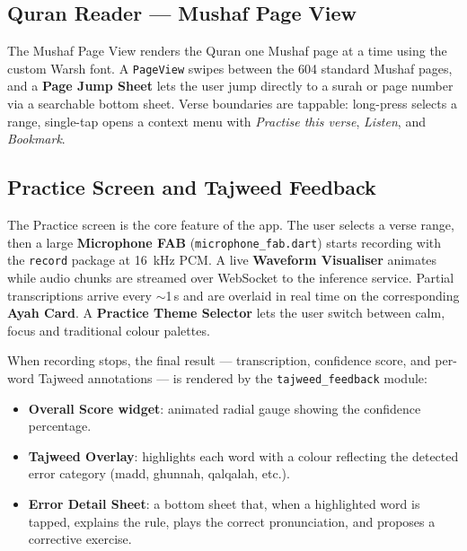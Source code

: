 
\subsection{Quran Reader --- Mushaf Page View}

The Mushaf Page View renders the Quran one Mushaf page at a time using the custom Warsh font. A \texttt{PageView} swipes between the 604 standard Mushaf pages, and a \textbf{Page Jump Sheet} lets the user jump directly to a surah or page number via a searchable bottom sheet. Verse boundaries are tappable: long-press selects a range, single-tap opens a context menu with \emph{Practise this verse}, \emph{Listen}, and \emph{Bookmark}.



\subsection{Practice Screen and Tajweed Feedback}

The Practice screen is the core feature of the app. The user selects a verse range, then a large \textbf{Microphone FAB} (\texttt{microphone\_fab.dart}) starts recording with the \texttt{record} package at 16~kHz PCM. A live \textbf{Waveform Visualiser} animates while audio chunks are streamed over WebSocket to the inference service. Partial transcriptions arrive every $\sim$1\,s and are overlaid in real time on the corresponding \textbf{Ayah Card}. A \textbf{Practice Theme Selector} lets the user switch between calm, focus and traditional colour palettes.

When recording stops, the final result --- transcription, confidence score, and per-word Tajweed annotations --- is rendered by the \texttt{tajweed\_feedback} module:

\begin{itemize}[leftmargin=2em]
  \item \textbf{Overall Score widget}: animated radial gauge showing the confidence percentage.
  \item \textbf{Tajweed Overlay}: highlights each word with a colour reflecting the detected error category (madd, ghunnah, qalqalah, etc.).
  \item \textbf{Error Detail Sheet}: a bottom sheet that, when a highlighted word is tapped, explains the rule, plays the correct pronunciation, and proposes a corrective exercise.
\end{itemize}

